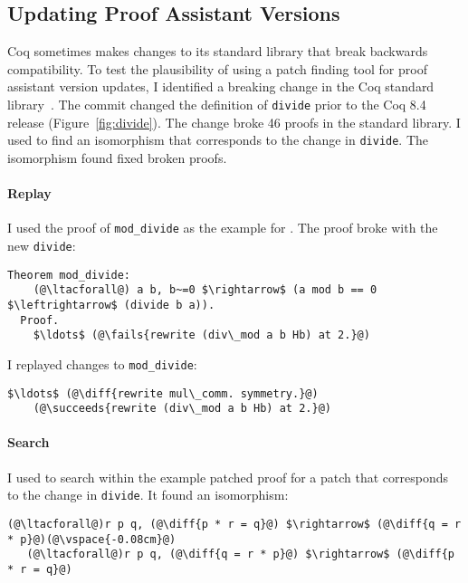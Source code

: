 \lstset{language=coq, aboveskip=3pt,belowskip=3pt}

\subsection{Updating Proof Assistant Versions}
\label{sec:coq}

Coq sometimes makes changes to its standard library that break
backwards compatibility.
To test the plausibility of using a patch finding tool for proof assistant version updates,
I identified a breaking change in the Coq standard library~\cite{coq84commit}.
The commit changed the definition of \lstinline{divide} prior to the Coq 8.4 release (Figure~\ref{fig:divide}).
The change broke 46 proofs in the standard library.
I used \sysname to find an isomorphism that corresponds to the change in \lstinline{divide}.
The isomorphism \sysname found fixed broken proofs.

\paragraph{Replay} I used the proof of \lstinline{mod_divide} as the example for \sysname.
The proof broke with the new \lstinline{divide}:

\begin{lstlisting}[language=coq]
  Theorem mod_divide:
    (@\ltacforall@) a b, b~=0 $\rightarrow$ (a mod b == 0 $\leftrightarrow$ (divide b a)).
  Proof.
    $\ldots$ (@\fails{rewrite (div\_mod a b Hb) at 2.}@)
\end{lstlisting}
I replayed changes to \lstinline{mod_divide}:

\begin{lstlisting}[language=coq]
    $\ldots$ (@\diff{rewrite mul\_comm. symmetry.}@)
    (@\succeeds{rewrite (div\_mod a b Hb) at 2.}@)
\end{lstlisting}

\paragraph{Search} I used \sysname to search within the example patched proof for a patch
that corresponds to the change in \lstinline{divide}.
It found an isomorphism:

\begin{lstlisting}[language=coq]
   (@\ltacforall@)r p q, (@\diff{p * r = q}@) $\rightarrow$ (@\diff{q = r * p}@)(@\vspace{-0.08cm}@)
   (@\ltacforall@)r p q, (@\diff{q = r * p}@) $\rightarrow$ (@\diff{p * r = q}@)
\end{lstlisting}

